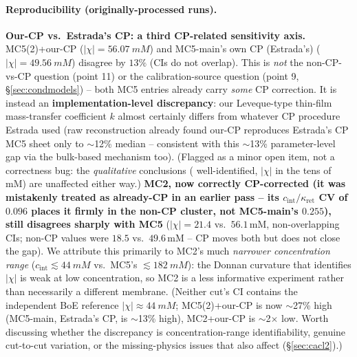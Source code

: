 \documentclass[11pt]{article}
\newcommand{\note}[1]{{\color{blue}\textsf{(#1)}}}
\newcommand{\cint}{c_{\mathrm{int}}}
\begin{document}
\paragraph{Reproducibility (originally-processed runs).} \textbf{Our-CP vs.\
Estrada's CP: a third CP-related sensitivity axis.} MC5(2)+our-CP
($|\chi|=\SI{56.07}{mM}$) and MC5-main's own CP (Estrada's)
($|\chi|=\SI{49.56}{mM}$) disagree by $13\%$ (CIs do not overlap). This is
\emph{not} the non-CP-vs-CP question (point 11) or the calibration-source
question (point 9, \S\ref{sec:condmodels}) -- both MC5 entries already carry
\emph{some} CP correction. It is instead an \textbf{implementation-level
discrepancy}: our Leveque-type thin-film mass-transfer coefficient $k$ almost
certainly differs from whatever CP procedure Estrada used (raw reconstruction
already
found our-CP reproduces Estrada's CP MC5 sheet only to $\sim$12\% median --
consistent with this $\sim$13\% parameter-level gap
via the bulk-based mechanism too). \note{Flagged as a minor open item, not a
correctness bug: the \emph{qualitative} conclusions (\ce{NaCl} well-identified,
$|\chi|$ in the tens of mM) are unaffected either way.} \textbf{MC2, now
correctly CP-corrected (it was mistakenly treated as already-CP in an earlier
pass -- its $\cint/\kappa_{\mathrm{ret}}$ CV of $0.096$ places it firmly
in the non-CP cluster, not MC5-main's $0.255$), still disagrees sharply with
MC5} ($|\chi|=21.4$ vs.\ $56.1$\,mM, non-overlapping CIs; non-CP values were
$18.5$ vs.\ $49.6$\,mM -- CP moves both but does not close the gap). We
attribute this primarily to MC2's much \emph{narrower concentration range}
($\cint\lesssim\SI{44}{mM}$ vs.\ MC5's $\lesssim\SI{182}{mM}$): the Donnan
curvature that identifies $|\chi|$ is weak at low concentration, so MC2 is a
less informative experiment rather than necessarily a different membrane.
\note{Neither cut's CI contains the independent
BoE reference $|\chi|\approx\SI{44}{mM}$; MC5(2)+our-CP is now $\sim$27\% high
(MC5-main, Estrada's CP, is $\sim$13\% high), MC2+our-CP is $\sim$2$\times$
low. Worth discussing whether the discrepancy is concentration-range
identifiability, genuine cut-to-cut variation, or the missing-physics issues that
also affect \ce{CaCl2} (\S\ref{sec:cacl2}).}
\end{document}
